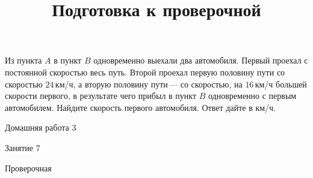 \begin{class}[number=6]
	\begin{listofex}
		\item Из пункта \(A\) в пункт \(B\) одновременно выехали два автомобиля. Первый проехал с постоянной скоростью весь путь. Второй проехал первую половину пути со скоростью \(24\) км/ч, а вторую половину пути --- со скоростью, на \(16\) км/ч большей скорости первого, в результате чего прибыл в пункт \(B\) одновременно с первым автомобилем. Найдите скорость первого автомобиля. Ответ дайте в км/ч.
	\end{listofex}
\end{class}

\begin{homework}[number=3]
	\begin{listofex}
		\item Домашняя работа 3
	\end{listofex}
\end{homework}

\begin{class}[number=7]
	\title{Подготовка к проверочной}
	\begin{listofex}
		\item Занятие 7
	\end{listofex}
\end{class}

\begin{exam}
	\begin{listofex}
		\item Проверочная
	\end{listofex}
\end{exam}

%	

